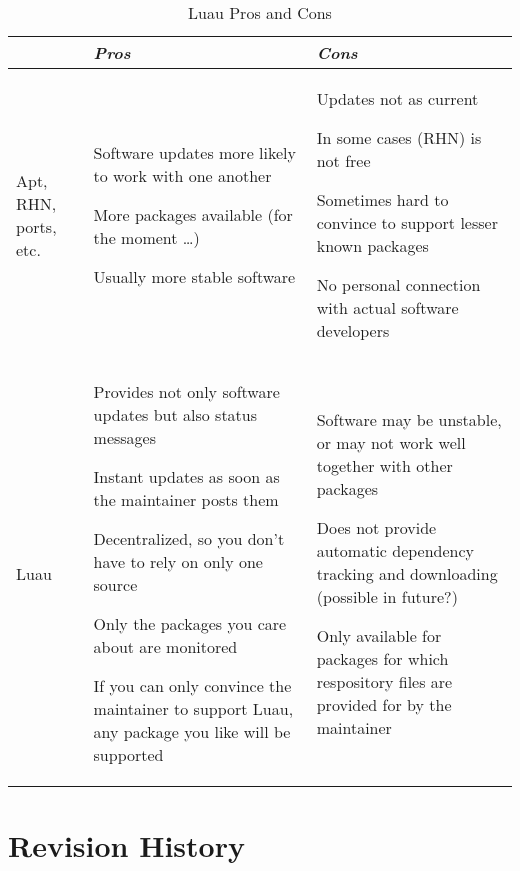 \documentclass{report}
\begin{document}
\begin{table}
\caption{Luau Pros and Cons}
\label{table:pros}
\begin{tabular}[htb]{|p{2cm}|p{4cm}|p{4cm}|}
\hline
 & \emph{Pros} & \emph{Cons} \\
\hline
\begin{flushleft}
Apt, RHN, ports, etc.
\end{flushleft}
& 
\begin{flushleft}
Software updates more likely to work with one another

More packages available (for the moment \ldots)

Usually more stable software
\end{flushleft}
&
\begin{flushleft}
Updates not as current

In some cases (RHN) is not free

Sometimes hard to convince to support lesser known packages

No personal connection with actual software developers
\end{flushleft}
\\
\hline
\begin{flushleft}
Luau
\end{flushleft}
&
\begin{flushleft}
Provides not only software updates but also status messages

Instant updates as soon as the maintainer posts them

Decentralized, so you don't have to rely on only one source

Only the packages you care about are monitored

If you can only convince the maintainer to support Luau, any package you like will be supported
\end{flushleft}
&
\begin{flushleft}
Software may be unstable, or may not work well together with other packages

Does not provide automatic dependency tracking and downloading (possible in future?)

Only available for packages for which respository files are provided for by the maintainer
\end{flushleft}
\\
\hline
\end{tabular}
\end{table}

\section{Revision History}
\end{document}
